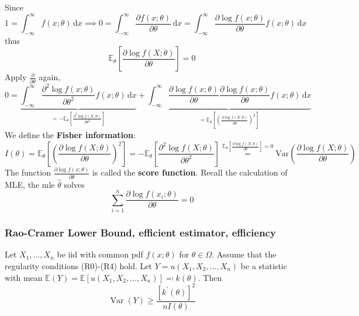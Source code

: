 Since
\[
1=\int_{-\infty}^{\infty} f(x;\theta) \, \mathrm{d}x \implies 0=\int_{-\infty}^{\infty} \frac{ \partial f(x;\theta) }{ \partial \theta }  \, \mathrm{d}x =\int_{-\infty}^{\infty} \frac{ \partial \log f(x;\theta) }{ \partial \theta } f(x;\theta) \, \mathrm{d}x 
\]
thus
\[
\mathbb{E}_{\theta}\left[ \frac{ \partial \log f(X;\theta) }{ \partial \theta }  \right]=0
\]
Apply $\frac{ \partial   }{ \partial \theta }$ again,
\[
0=\underbrace{ \int_{-\infty}^{\infty} \frac{ \partial^2\log f(x;\theta) }{ \partial \theta ^2 } f(x;\theta) \, \mathrm{d}x }_{ =-\mathbb{E}_{\theta}\left[ \frac{ \partial^2 \log f(X;\theta) }{ \partial \theta ^2 }  \right] } +\underbrace{ \int_{-\infty}^{\infty} \frac{ \partial \log f(x;\theta) }{ \partial \theta } \frac{ \partial \log f(x;\theta) }{ \partial \theta } f(x;\theta) \, \mathrm{d}x }_{ =\mathbb{E}_{\theta}\left[ \left( \frac{ \partial \log f(X;\theta) }{ \partial \theta }  \right)^2 \right] }
\]
We define the \textbf{Fisher information}:
\[
I(\theta)=\mathbb{E}_{\theta}\left[ \left( \frac{ \partial \log f(X;\theta) }{ \partial \theta }  \right)^2 \right]=-\mathbb{E}_{\theta}\left[ \frac{ \partial^2 \log f(X;\theta) }{ \partial \theta ^2 }  \right]\overset{ \mathbb{E}_{\theta}\left[ \frac{ \partial \log f(X;\theta) }{ \partial \theta }  \right]=0 }{ = }\mathrm{Var}\left( \frac{ \partial \log f(X;\theta) }{ \partial \theta }  \right)
\]
The function $\frac{ \partial \log f(x;\theta) }{ \partial \theta }$ is called the \textbf{score function}. Recall the calculation of MLE, the mle $\widehat{\theta}$ solves
\[
\sum_{i=1}^{n} \frac{ \partial \log f(x_i;\theta) }{ \partial \theta }=0
\]
\subsubsection{Rao-Cramer Lower Bound, efficient estimator, efficiency}

\begin{theorem}
Let $X_1, \ldots, X_n$ be iid with common pdf $f(x ; \theta)$ for $\theta \in \Omega$. Assume that the regularity conditions (R0)-(R4) hold. Let $Y=u\left(X_1, X_2, \ldots, X_n\right)$ be a statistic with mean $\mathbb{E}(Y)=\mathbb{E}\left[u\left(X_1, X_2, \ldots, X_n\right)\right]\eqqcolon k(\theta)$. Then
\begin{equation}
\operatorname{Var}(Y) \geq \frac{\left[k^{\prime}(\theta)\right]^2}{n I(\theta)}
\label{a64f1e}
\end{equation}
\end{theorem}

